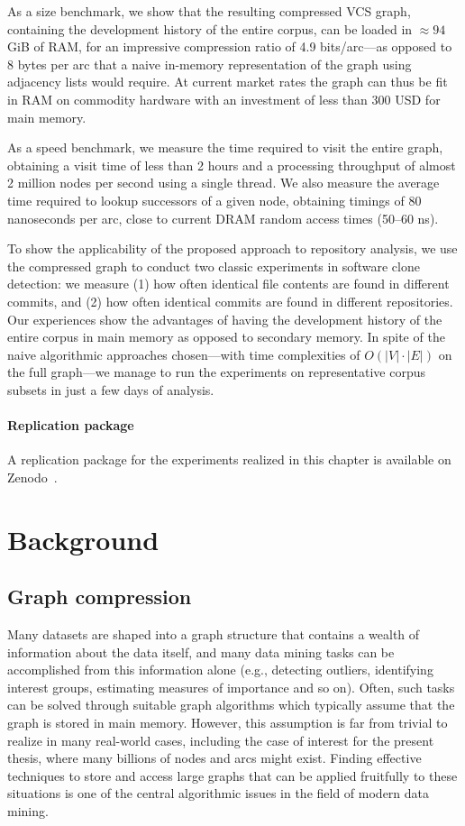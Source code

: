 As a size benchmark, we show that the resulting compressed VCS graph,
containing the development history of the entire corpus, can be loaded in
$\approx 94$\,GiB of RAM, for an impressive compression ratio of 4.9
bits/arc---as opposed to 8 bytes per arc that a naive in-memory representation
of the graph using adjacency lists would require. At current market rates the
graph can thus be fit in RAM on commodity hardware with an investment of less
than 300 USD for main memory.

As a speed benchmark, we measure the time required to visit the entire graph,
obtaining a visit time of less than 2 hours and a processing throughput of
almost 2 million nodes per second using a single thread. We also measure the
average time required to lookup successors of a given node, obtaining timings
of 80 nanoseconds per arc, close to current DRAM random access times (50--60
ns).

To show the applicability of the proposed approach to repository analysis, we
use the compressed graph to conduct two classic experiments in software clone
detection: we measure (1) how often identical file contents are found in
different commits, and (2) how often identical commits are found in different
repositories. Our experiences show the advantages of having the development
history of the entire corpus in main memory as opposed to secondary memory.
In spite of the naive algorithmic approaches chosen---with time complexities
of $O(|V|\cdot |E|)$ on the full graph---we manage to run the experiments on
representative corpus subsets in just a few days of analysis.

\paragraph*{Replication package}
A replication package for the experiments realized in this chapter is available
on Zenodo~\cite{swh-saner2020graph-replication}.

\section{Background}%
\label{sec:compression-background}

\subsection{Graph compression}

Many datasets are shaped into a graph structure that contains a wealth of
information about the data itself, and many data mining tasks can be
accomplished from this information alone (e.g., detecting outliers, identifying
interest groups, estimating measures of importance and so on). Often, such
tasks can be solved through suitable graph algorithms which typically assume
that the graph is stored in main memory.  However, this assumption is far from
trivial to realize in many real-world cases, including the case of interest for
the present thesis, where many billions of nodes and arcs might exist. Finding
effective techniques to store and access large graphs that can be applied
fruitfully to these situations is one of the central algorithmic issues in the
field of modern data mining.

